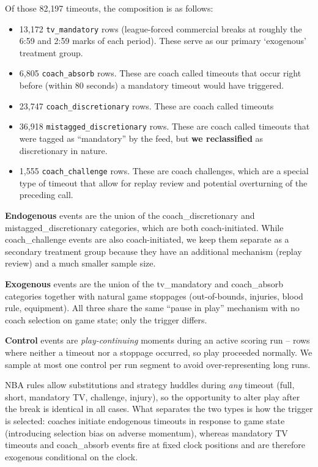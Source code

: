 \documentclass[twoside,11pt]{article}
\begin{document}
Of those 82{,}197 timeouts, the composition is as follows:

\begin{itemize}
		\item 13{,}172 \texttt{tv\_mandatory} rows (league-forced commercial breaks at roughly the 6:59 and 2:59
				marks of each period). These serve as our primary `exogenous' treatment group.
		\item 6{,}805 \texttt{coach\_absorb} rows. These are coach called timeouts that occur right before (within
				80 seconds) a mandatory timeout would have triggered.
		\item 23{,}747 \texttt{coach\_discretionary} rows. These are coach called timeouts
		\item 36{,}918 \texttt{mistagged\_discretionary} rows. These are coach called timeouts that were tagged as
				``mandatory'' by the feed, but \textbf{we reclassified} as discretionary in nature.
		\item 1{,}555 \texttt{coach\_challenge} rows. These are coach challenges, which are a special type of timeout that
				allow for replay review and potential overturning of the preceding call.
\end{itemize}

\textbf{Endogenous} events are the union of the coach\_discretionary and mistagged\_discretionary
categories, which are both coach-initiated. While coach\_challenge events are also coach-initiated, we keep
them separate as a secondary treatment group because they have an additional mechanism (replay review) and a much
smaller sample size.

\textbf{Exogenous} events are the union of the tv\_mandatory and coach\_absorb categories together with
natural game stoppages (out-of-bounds, injuries, blood rule, equipment).
All three share the same ``pause in play'' mechanism with no coach selection on game state; only the
trigger differs.

\textbf{Control} events are \emph{play-continuing} moments during an active scoring run -- rows where
neither a timeout nor a stoppage occurred, so play proceeded normally. We sample at most one control per
run segment to avoid over-representing long runs.

NBA rules allow substitutions and strategy huddles during \emph{any} timeout (full, short, mandatory TV,
challenge, injury), so the opportunity to alter play after the break is identical in all cases. What
separates the two types is how the trigger is selected: coaches initiate endogenous timeouts in response to
game state (introducing selection bias on adverse momentum), whereas mandatory TV timeouts and coach\_absorb
events fire at fixed clock positions and are therefore exogenous conditional on the clock.
\end{document}
